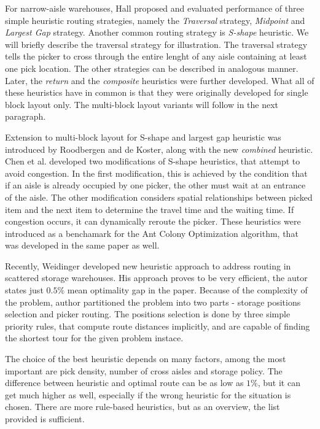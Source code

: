 For narrow-aisle warehouses, Hall proposed and evaluated performance of three simple heuristic routing strategies\cite{hall1993}, namely the \emph{Traversal} strategy, \emph{Midpoint} and \emph{Largest Gap} strategy. Another common routing strategy is \emph{S-shape} heuristic. We will briefly describe the traversal strategy for illustration. The traversal strategy tells the picker to cross through the entire lenght of any aisle containing at least one pick location. The other strategies can be described in analogous manner. Later, the \emph{return} and the \emph{composite} heuristics were further developed\cite{petersen1997evaluation}. What all of these heuristics have in common is that they were originally developed for single block layout only. The multi-block layout variants will follow in the next paragraph.
\par

Extension to multi-block layout for S-shape and largest gap heuristic was introduced by Roodbergen and de Koster, along with the new \emph{combined} heuristic\cite{roodbergen2001}. Chen et al. developed two modifications of S-shape heuristics\cite{chen2013ant}, that attempt to avoid congestion. In the first modification, this is achieved by the condition that if an aisle is already occupied by one picker, the other must wait at an entrance of the aisle. The other modification considers spatial relationships between picked item and the next item to determine the travel time and the waiting time. If congestion occurs, it can dynamically reroute the picker. These heuristics were introduced as a benchamark for the Ant Colony Optimization algorithm, that was developed in the same paper as well.

\par
Recently, Weidinger developed new heuristic approach to address routing in scattered storage warehouses\cite{weidinger2018}. His approach proves to be very efficient, the autor states just $0.5\%$ mean optimality gap in the paper. Because of the complexity of the problem, author partitioned the problem into two parts - storage positions selection and picker routing. The positions selection is done by three simple priority rules, that compute route distances implicitly, and are capable of finding the shortest tour for the given problem instace.
\par
The choice of the best heuristic depends on many factors, among the most important are pick density, number of cross aisles and storage policy. The difference between heuristic and optimal route can be as low as $1\%$, but it can get much higher as well\cite{roodbergen2001}, especially if the wrong heuristic for the situation is chosen. There are more rule-based heuristics, but as an overview, the list provided is sufficient.

